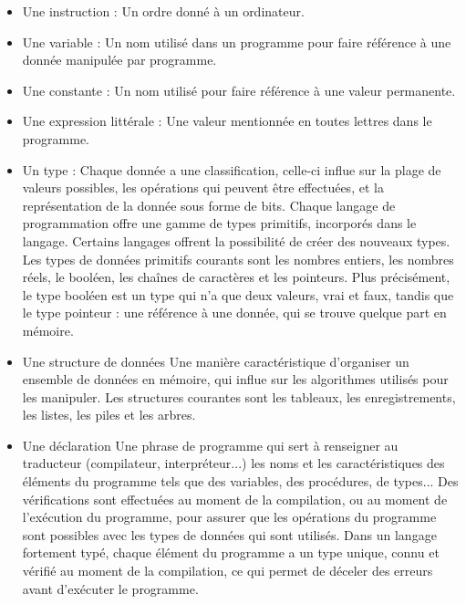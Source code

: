 \documentclass[a4paper,12pt]{article}
\begin{document}
\begin{itemize}[label=\textbullet]

\setlength{\itemindent}{-1.5em}

\item Une instruction :
\newline Un ordre donné à un ordinateur\cite{ada}.

\item Une variable :
\newline Un nom utilisé dans un programme pour faire référence à une donnée manipulée par programme.

\item Une constante : 
\newline Un nom utilisé pour faire référence à une valeur permanente.

\item Une expression littérale :
\newline Une valeur mentionnée en toutes lettres dans le programme\cite{thakare}.

\item Un type :
\newline Chaque donnée a une classification, celle-ci influe sur la plage de valeurs possibles, les opérations qui peuvent être effectuées, et la représentation de la donnée sous forme de bits\cite{thakare}. Chaque langage de programmation offre une gamme de types primitifs, incorporés dans le langage. Certains langages offrent la possibilité de créer des nouveaux types.		
\newline Les types de données primitifs courants sont les nombres entiers, les nombres réels, le booléen, les chaînes de caractères et les pointeurs.
\newline Plus précisément, le type booléen est un type qui n'a que deux valeurs, vrai et faux, tandis que le type pointeur : une référence à une donnée, qui se trouve quelque part en mémoire\cite{thakare}.

\item Une structure de données
\newline Une manière caractéristique d'organiser un ensemble de données en mémoire, qui influe sur les algorithmes utilisés pour les manipuler. Les structures courantes sont les tableaux, les enregistrements, les listes, les piles et les arbres\cite{krishnamurthy}.

\item Une déclaration
\newline Une phrase de programme qui sert à renseigner au traducteur (compilateur, interpréteur...) les noms et les caractéristiques des éléments du programme tels que des variables, des procédures, de types\cite{william}...
\newline Des vérifications sont effectuées au moment de la compilation, ou au moment de l'exécution du programme, pour assurer que les opérations du programme sont possibles avec les types de données qui sont utilisés. Dans un langage fortement typé, chaque élément du programme a un type unique, connu et vérifié au moment de la compilation, ce qui permet de déceler des erreurs avant d'exécuter le programme\cite{william}.


\end{itemize}
\end{document}
